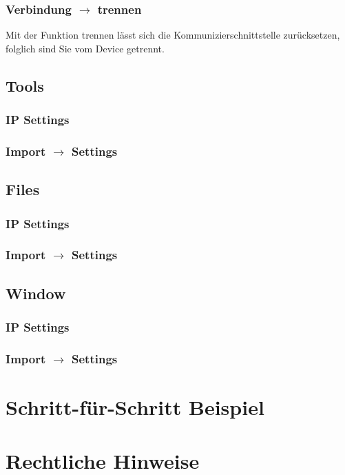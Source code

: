 \documentclass[11pt]{article} %
\begin{document}
\subsubsection{Verbindung $\rightarrow$ trennen}
Mit der Funktion trennen lässt sich die Kommunizierschnittstelle zurücksetzen, folglich sind Sie vom Device getrennt.\\
\subsection{Tools}
\subsubsection{IP Settings}
\subsubsection{Import $\rightarrow$ Settings}

\subsection{Files}
\subsubsection{IP Settings}
\subsubsection{Import $\rightarrow$ Settings}

\subsection{Window}
\subsubsection{IP Settings}
\subsubsection{Import $\rightarrow$ Settings}

\section{Schritt-für-Schritt Beispiel}

\section{Rechtliche Hinweise}
\end{document}
